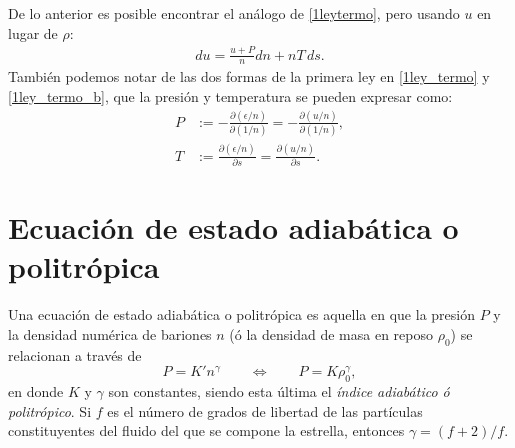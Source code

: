 De lo anterior es posible encontrar el análogo de \eqref{1leytermo}, pero usando $u$ en lugar de $\rho$:
\begin{align}
  du=\frac{u+P}{n}dn + nT\,ds.
\end{align}
También podemos notar de las dos formas de la primera ley en \eqref{1ley_termo} y \eqref{1ley_termo_b}, que la presión y temperatura se pueden expresar como:
\begin{align}
 P&:=-\frac{\partial (\epsilon/n)}{\partial(1/n)}=-\frac{\partial (u/n)}{\partial(1/n)} \label{def_presion},\\
T&:=\frac{\partial (\epsilon/n)}{\partial s}=\frac{\partial (u/n)}{\partial s}\label{def_temperatura}.
\end{align}

\section{Ecuación de estado adiabática o politrópica}
Una ecuación de estado adiabática o politrópica es aquella en que la presión $P$ y la densidad numérica de bariones $n$ (ó la densidad de masa en reposo $\rho_0$) se relacionan a través de
\begin{equation}\label{estadopolitropica_general}
 P=K'n^{\gamma}\qquad\Leftrightarrow\qquad P=K\rho_0^{\gamma},
\end{equation}
en donde $K$ y $\gamma$ son constantes, siendo esta última el \textit{índice adiabático ó politrópico}. Si $f$ es el número de grados de libertad de las partículas constituyentes del fluido del que se compone la estrella, entonces $\gamma=(f+2)/f$. 


